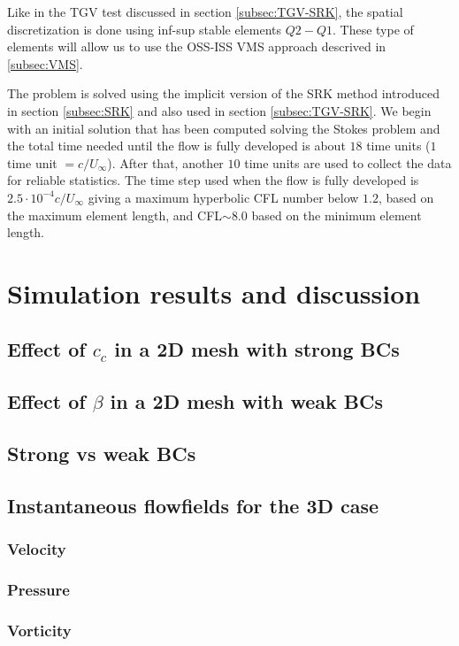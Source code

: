 Like in the TGV test discussed in section \ref{subsec:TGV-SRK}, the spatial discretization is done using inf-sup stable elements $Q2-Q1$. These type of elements will allow us to use the OSS-ISS VMS approach descrived in \ref{subsec:VMS}. 

The problem is solved using the implicit version of the SRK method introduced in section \ref{subsec:SRK} and also used in section \ref{subsec:TGV-SRK}. We begin with an initial solution that has been computed solving the Stokes problem and the total time needed until the flow is fully developed is about $18$ time units ($1$ time unit $=c/U_\infty$). After that, another $10$ time units are used to collect the data for reliable statistics. The time step used when the flow is fully developed is $2.5\cdot10^{-4}c/U_\infty$ giving a maximum hyperbolic CFL number below $1.2$, based on the maximum element length, and CFL$\sim8.0$ based on the minimum element length.

\section{Simulation results and discussion}
\label{sec-C8_results}

\subsection{Effect of $ c_c $ in a 2D mesh with strong BCs}
\subsection{Effect of $ \beta $ in a 2D mesh with weak BCs}
\subsection{Strong vs weak BCs}
\subsection{Instantaneous flowfields for the 3D case}
\subsubsection{Velocity}
\subsubsection{Pressure}
\subsubsection{Vorticity}
